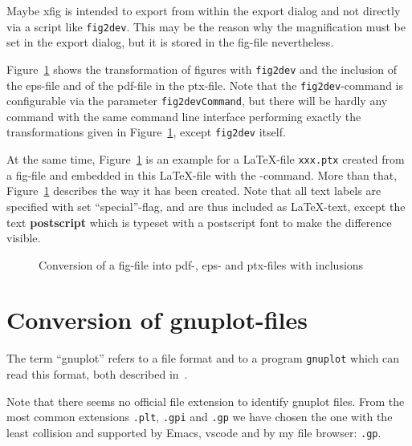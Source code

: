 Maybe xfig is intended to export from within the export dialog 
and not directly via a script like \texttt{fig2dev}. 
This may be the reason 
why the magnification must be set in the export dialog, 
but it is stored in the fig-file nevertheless. 

Figure~\ref{fig:fig2dev} shows the transformation 
of figures with \texttt{fig2dev} 
and the inclusion of the eps-file and of the pdf-file in the ptx-file. 
Note that the \texttt{fig2dev}-command is configurable 
via the parameter \texttt{fig2devCommand}, 
but there will be hardly any command with the same command line interface 
performing exactly the transformations given in Figure~\ref{fig:fig2dev}, 
except \texttt{fig2dev} itself. 

At the same time, Figure~\ref{fig:fig2dev} is an example 
for a \LaTeX-file \texttt{xxx.ptx} created from a fig-file 
and embedded in this \LaTeX-file 
with the -command. 
More than that, 
Figure~\ref{fig:fig2dev} describes the way it has been created. 
Note that all text labels are specified with set ``special''-flag, 
and are thus included as \LaTeX-text, 
except the text \textbf{\tiny postscript} 
which is typeset with a postscript font to make the difference visible. 


\begin{figure}[htb]
\centering
{}
\caption{\label{fig:fig2dev}Conversion of a fig-file 
into pdf-, eps- and ptx-files with inclusions}
\end{figure}


\section{Conversion of gnuplot-files}\label{sec:gnuplot2dev}

The term ``gnuplot'' refers to a file format
and to a program \texttt{gnuplot}
which can read this format, both described in~\cite{GnuPlot}. 

Note that there seems no official file extension 
to identify gnuplot files. 
From the most common extensions \texttt{.plt}, \texttt{.gpi} and \texttt{.gp} 
we have chosen the one with the least collision 
and supported by Emacs, vscode and by my file browser: \texttt{.gp}. 


